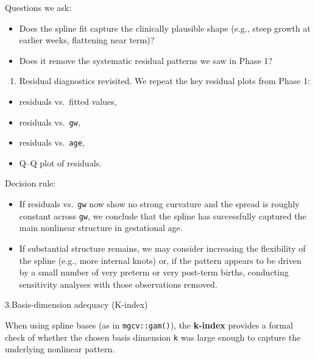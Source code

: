 \documentclass[
  letterpaper,
  DIV=11,
  numbers=noendperiod]{scrreprt}
\providecommand{\tightlist}{%
  \setlength{\itemsep}{0pt}\setlength{\parskip}{0pt}}\usepackage{longtable,booktabs,array}
\begin{document}
Questions we ask:

\begin{itemize}
\tightlist
\item
  Does the spline fit capture the clinically plausible shape (e.g.,
  steep growth at earlier weeks, flattening near term)?\\
\item
  Does it remove the systematic residual patterns we saw in Phase 1?
\end{itemize}

\begin{enumerate}
\def\labelenumi{\arabic{enumi}.}
\setcounter{enumi}{1}
\tightlist
\item
  Residual diagnostics revisited. We repeat the key residual plots from
  Phase 1:
\end{enumerate}

\begin{itemize}
\tightlist
\item
  residuals vs.~fitted values,\\
\item
  residuals vs.~\texttt{gw},\\
\item
  residuals vs.~\texttt{age},\\
\item
  Q--Q plot of residuals.
\end{itemize}

Decision rule:

\begin{itemize}
\tightlist
\item
  If residuals vs.~\texttt{gw} now show no strong curvature and the
  spread is roughly constant across \texttt{gw}, we conclude that the
  spline has successfully captured the main nonlinear structure in
  gestational age.\\
\item
  If substantial structure remains, we may consider increasing the
  flexibility of the spline (e.g., more internal knots) or, if the
  pattern appears to be driven by a small number of very preterm or very
  post-term births, conducting sensitivity analyses with those
  observations removed.
\end{itemize}

3.Basis-dimension adequacy (K-index)

When using spline bases (as in \texttt{mgcv::gam()}), the
\textbf{k-index} provides a formal check of whether the chosen basis
dimension \texttt{k} was large enough to capture the underlying
nonlinear pattern.
\end{document}
